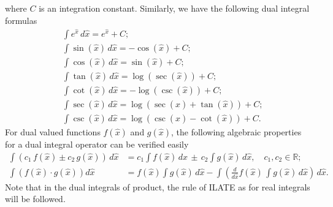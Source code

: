 \documentclass[11pt,a4paper,fleqn]{article}
\numberwithin{equation}{section}
\numberwithin{lemma}{section}
\numberwithin{theorem}{section}
\numberwithin{corollary}{section}
\begin{document}
where $C$ is an integration constant. Similarly, we have the following dual integral formulas
\begin{align*}
	& \int  e^{\widehat{x}} \, d \widehat{x} = e^{\widehat{x}} + C; \\
	&  \int  \sin (\widehat{x})\, d \widehat{x} = - \cos (\widehat{x}) + C;\\
	& \int  \cos (\widehat{x}) \, d \widehat{x} =  \sin (\widehat{x}) + C; \\
	&  \int  \tan (\widehat{x}) \, d \widehat{x} = \log \left(\sec (\widehat{x})\right) + C;\\
	& \int \cot (\widehat{x}) \, d \widehat{x} = - \log \left(\csc (\widehat{x})\right) + C;\\
	& \int  \sec (\widehat{x}) \, d \widehat{x} = \log (\sec (\widehat{x}) + \tan (\widehat{x})) + C;\\
	& \int  \csc (\widehat{x}) \, d \widehat{x} = \log  (\csc (\widehat{x}) - \cot (\widehat{x})) + C.
\end{align*}
For dual valued functions $f(\widehat{x})$ and $g(\widehat{x})$, the following algebraic properties for a dual integral operator can be verified easily
\begin{align*}
	\int (c_1 \, f(\widehat{x}) \pm c_2 \, g(\widehat{x})) \, d \widehat{x} & = c_1   \int f(\widehat{x}) \, d \widehat{x} \, \pm  \, c_2   \int g(\widehat{x}) \, d \widehat{x}, \quad c_1, c_2 \in \mathbb{R};
	\\[5pt]
	\int ( f(\widehat{x}) \cdot  g(\widehat{x})) d\widehat{x} & =    f(\widehat{x}) \int g(\widehat{x}) \, d \widehat{x} - \int \left(\frac{d}{d\widehat{x}} f(\widehat{x}) \,  \int g(\widehat{x}) \, d \widehat{x}\right) \, d \widehat{x}.
\end{align*}
Note that in the dual integrals of product, the rule of ILATE as for real integrals will be followed. 
\end{document}
